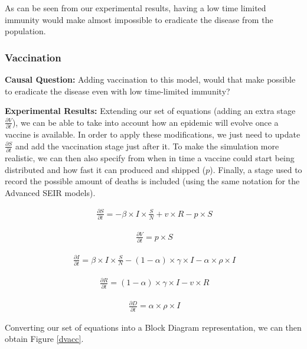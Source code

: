 As can be seen from our experimental results, having a low time limited immunity would make almost impossible to eradicate the disease from the population. 

\subsubsection{Vaccination}

\textbf{Causal Question:} Adding vaccination to this model, would that make possible to eradicate the disease even with low time-limited immunity?

\textbf{Experimental Results:} Extending our set of equations (adding an extra stage $\frac{\partial V}{\partial t}$), we can be able to take into account how an epidemic will evolve once a vaccine is available. In order to apply these modifications, we just need to update $\frac{\partial S}{\partial t}$ and add the vaccination stage just after it. To make the simulation more realistic, we can then also specify from when in time a vaccine could start being distributed and how fast it can produced and shipped ($p$). Finally, a stage used to record the possible amount of deaths is included (using the same notation for the Advanced SEIR models).

\useshortskip
\begin{align}
\ \frac{\partial S}{\partial t} = -\beta \times I \times \frac{S}{N} + v \times R - p \times S
\end{align}
\useshortskip

\useshortskip
\begin{align}
\ \frac{\partial V}{\partial t} = p \times S
\end{align}
\useshortskip

\useshortskip
\begin{align}
\ \frac{\partial I}{\partial t} = \beta \times I \times \frac{S}{N}  -(1-\alpha) \times \gamma \times I -\alpha \times \rho \times I
\end{align}
\useshortskip

\useshortskip
\begin{align}
\ \frac{\partial R}{\partial t} = (1-\alpha) \times \gamma \times I - v \times R
\end{align}
\useshortskip

\useshortskip
\begin{align}
\ \frac{\partial D}{\partial t} = \alpha \times \rho \times I
\end{align}
\useshortskip

Converting our set of equations into a Block Diagram representation, we can then obtain Figure \ref{dvacc}.


